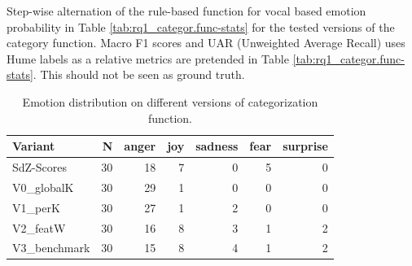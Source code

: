 Step-wise alternation of the rule-based function for vocal based emotion probability in Table \ref{tab:rq1_categor.func-stats} for the tested versions of the category function. 
Macro F1 scores and UAR (Unweighted Average Recall) uses Hume labels as a relative metrics are pretended in Table \ref{tab:rq1_categor.func-stats}. This should not be seen as ground truth. 

\begin{table}[ht]
  \centering
  \begin{tabular}{lrrrrrr}
    \toprule
    Variant      &  N & anger & joy & sadness & fear & surprise \\
    \midrule
    SdZ-Scores   & 30 &    18 &   7 &       0 &    5 &        0 \\
    V0\_globalK  & 30 &    29 &   1 &       0 &    0 &        0 \\
    V1\_perK     & 30 &    27 &   1 &       2 &    0 &        0 \\
    V2\_featW   & 30 &    16 &   8 &       3 &    1 &        2 \\
    V3\_benchmark    & 30 &    15 &   8 &       4 &    1 &        2 \\
    \bottomrule
  \end{tabular}
  \caption{Emotion distribution on different versions of categorization function.}
  \label{tab:rq1_emotion-cat-labels}
\end{table}


